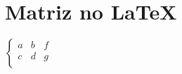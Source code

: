 \documentclass[12pt]{report}
\begin{document}
\section{ Matriz no \LaTeX}
$
\left\{\begin{array}{ccc}
a & b & f \\
c & d & g \\
\end{array}\right.
$
\end{document}
